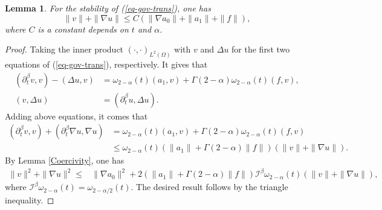 \documentclass[11pt]{article}
\newtheorem{lemma}{Lemma}[section]
\numberwithin{equation}{section}
\begin{document}
\begin{lemma}
For the stability of (\ref{eq-gov-trans}), one has    
$$\|v\| + \|\nabla u\|\leq C(\|\nabla a_0\|+\|a_1\|+\|f\|),$$
where $C$ is a constant depends on $t$ and $\alpha$.
\end{lemma}
\begin{proof}
Taking the inner product $(\cdot,\cdot)_{L^2(\Omega)}$ with $v$ and $\Delta u$ for the first two equations of (\ref{eq-gov-trans}), respectively. It gives that
\begin{align*}
(\partial_t^\beta v,v) - (\Delta u,v) &= \omega_{2-\alpha}(t)(a_1,v)+\Gamma{(2-\alpha)}\omega_{2-\alpha}(t)(f,v), \\
(v,\Delta u)  &= (\partial_t^\beta u,\Delta u). 
\end{align*}
Adding above equations, it comes that
\begin{align*}
(\partial_t^\beta v,v) + (\partial_t^\beta \nabla u,\nabla u)
&= \omega_{2-\alpha}(t)(a_1,v)+\Gamma{(2-\alpha)}\omega_{2-\alpha}(t)(f,v)\\
&\le \omega_{2-\alpha}(t)(\|a_1\|+\Gamma{(2-\alpha)}\|f\|)(\|v\|+\|\nabla u\|).
\end{align*}
By Lemma \ref{Coercivity}, one has
\begin{align*}
\|v\|^2 + \|\nabla u\|^2
\le& \|\nabla a_0\|^2+2(\|a_1\|+\Gamma{(2-\alpha)}\|f\|)\mathcal{I}^{\beta}\omega_{2-\alpha}(t)(\|v\|+\|\nabla u\|),
\end{align*}
where $\mathcal{I}^{\beta}\omega_{2-\alpha}(t)=\omega_{2-\alpha/2}(t)$.
The desired result follows by the triangle inequality.
\end{proof}
\end{document}
